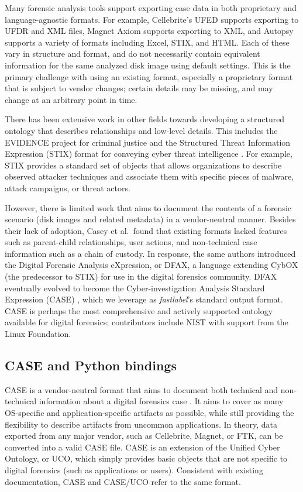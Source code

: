 Many forensic analysis tools support exporting case data in both
proprietary and language-agnostic formats. For example, Cellebrite's
UFED supports exporting to UFDR and XML files, Magnet Axiom supports
exporting to XML, and Autopsy supports a variety of formats including
Excel, STIX, and HTML. Each of these vary in structure and format, and
do not necessarily contain equivalent information for the same analyzed
disk image using default settings. This is the primary challenge with
using an existing format, especially a proprietary format that is
subject to vendor changes; certain details may be missing, and may
change at an arbitrary point in time.

There has been extensive work in other fields towards developing a
structured ontology that describes relationships and low-level details.
This includes the EVIDENCE project for criminal justice and the
Structured Threat Information Expression (STIX) format for conveying
cyber threat intelligence
\cite{caseyLeveragingCybOXStandardize2015}. For example, STIX
provides a standard set of objects that allows organizations to describe
observed attacker techniques and associate them with specific pieces of
malware, attack campaigns, or threat actors.

However, there is limited work that aims to document the contents of a
forensic scenario (disk images and related metadata) in a vendor-neutral
manner. Besides their lack of adoption, Casey et al.~found that existing
formats lacked features such as parent-child relationships, user
actions, and non-technical case information such as a chain of custody.
In response, the same authors introduced the Digital Forensic Analysis
eXpression, or DFAX, a language extending CybOX (the predecessor to
STIX) for use in the digital forensics community. DFAX eventually
evolved to become the Cyber-investigation Analysis Standard Expression
(CASE) \cite{caseyAdvancingCoordinatedCyberinvestigations2017},
which we leverage as \emph{fastlabel}'s standard output format. CASE is
perhaps the most comprehensive and actively supported ontology available
for digital forensics; contributors include NIST with support from the
Linux Foundation.

\subsection{CASE and Python
bindings}\label{case-and-python-bindings}

CASE is a vendor-neutral format that aims to document both technical and
non-technical information about a digital forensics case
\cite{caseyAdvancingCoordinatedCyberinvestigations2017}. It aims to
cover as many OS-specific and application-specific artifacts as
possible, while still providing the flexibility to describe artifacts
from uncommon applications. In theory, data exported from any major
vendor, such as Cellebrite, Magnet, or FTK, can be converted into a
valid CASE file. CASE is an extension of the Unified Cyber Ontology, or
UCO, which simply provides basic objects that are not specific to
digital forensics (such as applications or users). Consistent with
existing documentation, CASE and CASE/UCO refer to the same format.

